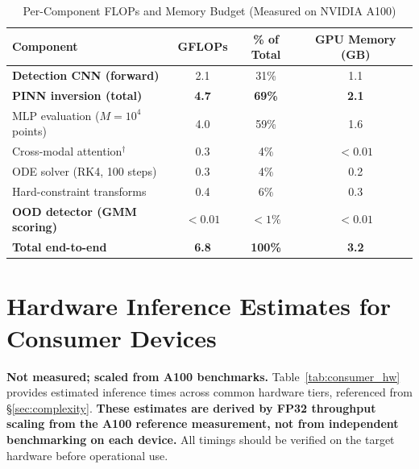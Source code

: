 \documentclass[usenatbib]{mnras}
\newcommand{\tablecomments}[1]{\vspace{4pt}{\footnotesize #1}\vspace{2pt}}
\begin{document}
\begin{table}[htbp]
\centering
\caption{Per-Component FLOPs and Memory Budget (Measured on NVIDIA A100)}\label{tab:flops_contribution}
\begin{tabular}{lccc}
\toprule
Component & GFLOPs & \% of Total & GPU Memory (GB) \\
\midrule
\textbf{Detection CNN (forward)} & 2.1 & 31\% & 1.1 \\
\midrule
\textbf{PINN inversion (total)} & \textbf{4.7} & \textbf{69\%} & \textbf{2.1} \\
\hspace{1em}MLP evaluation ($M=10^4$ points) & 4.0 & 59\% & 1.6 \\
\hspace{1em}Cross-modal attention$^\dagger$ & 0.3 & 4\% & $<0.01$ \\
\hspace{1em}ODE solver (RK4, 100 steps) & 0.3 & 4\% & 0.2 \\
\hspace{1em}Hard-constraint transforms & 0.4 & 6\% & 0.3 \\
\midrule
\textbf{OOD detector (GMM scoring)} & $<0.01$ & $<1\%$ & $<0.01$ \\
\midrule
\textbf{Total end-to-end} & \textbf{6.8} & \textbf{100\%} & \textbf{3.2} \\
\bottomrule
\end{tabular}
\tablecomments{All FLOPs measured on NVIDIA A100 (40~GB) with PyTorch~2.1.0, CUDA~12.1, batch size 1, input $256\times256\times1$ image + 1024-channel spectrum. Memory figures are inference-only. Cross-modal attention ($^\dagger$), ODE solver, and hard-constraint transforms are sub-components of the PINN inversion; their GFLOPs are included in the PINN total (4.7). Percentages may not sum exactly to 100\% due to rounding.}
\end{table}

\section{Hardware Inference Estimates for Consumer Devices}\label{app:consumer_hw}

\textbf{Not measured; scaled from A100 benchmarks.} Table~\ref{tab:consumer_hw} provides estimated inference times across common hardware tiers, referenced from \S\ref{sec:complexity}. \textbf{These estimates are derived by FP32 throughput scaling from the A100 reference measurement, not from independent benchmarking on each device.} All timings should be verified on the target hardware before operational use.
\end{document}
